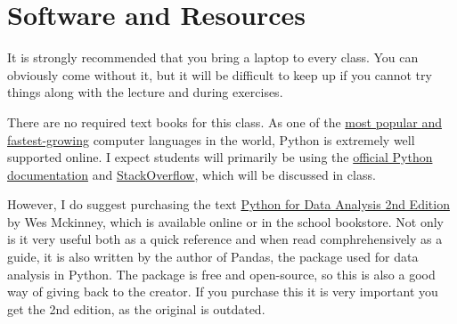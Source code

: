 \documentclass{article}
\begin{document}

\section*{Software and Resources}
It is strongly recommended that you bring a laptop to every class.  You can obviously come without it, but it will be difficult to keep up if you cannot try things along with the lecture and during exercises.

There are no required text books for this class.  As one of the \href{https://insights.stackoverflow.com/survey/2018/\#technology}{most popular and fastest-growing} computer languages in the world, Python is extremely well supported online.  I expect students will primarily be using the \href{https://docs.python.org/3/}{official Python documentation} and \href{https://stackoverflow.com/}{StackOverflow}, which will be discussed in class.  

However, I do suggest purchasing the text \href{https://www.amazon.com/Python-Data-Analysis-Wrangling-IPython/dp/1491957662/ref=sr_1_3?ie=UTF8\&qid=1550574627\&sr=8-3\&keywords=python+for+data+analysis+2nd}{Python for Data Analysis 2nd Edition} by Wes Mckinney, which is available online or in the school bookstore.  Not only is it very useful both as a quick reference and when read comphrehensively as a guide, it is also written by the author of Pandas, the package used for data analysis in Python.  The package is free and open-source, so this is also a good way of giving back to the creator.  If you purchase this it is very important you get the 2nd edition, as the original is outdated.
\end{document}
